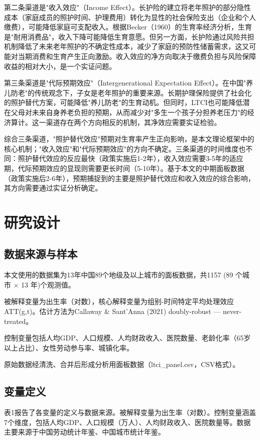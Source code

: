 \documentclass[11pt,a4paper]{article}
\begin{document}
第二条渠道是"收入效应"（Income Effect）。长护险的建立将老年照护的部分隐性成本（家庭成员的照护时间、护理费用）转化为显性的社会保险支出（企业和个人缴费），可能降低家庭可支配收入。根据Becker（1960）的生育率经济分析，生育是"耐用消费品"，收入下降可能降低生育意愿。但另一方面，长护险通过风险共担机制降低了未来老年照护的不确定性成本，减少了家庭的预防性储蓄需求，这又可能对当期消费和生育产生正向激励。收入效应的净方向取决于缴费负担与风险保障收益的相对大小，是一个实证问题。

第三条渠道是"代际预期效应"（Intergenerational Expectation Effect）。在中国"养儿防老"的传统观念下，子女是老年照护的重要来源。长期护理保险提供了社会化的照护替代方案，可能降低"养儿防老"的生育动机。但同时，LTCI也可能降低潜在父母对未来自身养老负担的预期，从而减少对"多生一个孩子分担养老压力"的经济算计。这一渠道存在两个方向相反的机制，其净效应需要实证检验。

综合三条渠道，"照护替代效应"预期对生育率产生正向影响，是本文理论框架中的核心机制；"收入效应"和"代际预期效应"的方向不确定。三条渠道的时间维度也不同：照护替代效应的反应最快（政策实施后1-2年），收入效应需要3-5年的适应期，代际预期效应的显现则需要更长时间（5-10年）。基于本文的中期面板数据（政策实施后2-6年），预期捕捉到的主要是照护替代效应和收入效应的综合影响，其方向需要通过实证分析确定。

\section{研究设计}
\subsection{数据来源与样本}

本文使用的数据集为13年中国89个地级及以上城市的面板数据，共1157 (89 个城市 × 13 年)个观测值。

被解释变量为出生率（对数），核心解释变量为组别-时间特定平均处理效应ATT(g,t)。估计方法为Callaway \& Sant'Anna (2021) doubly-robust — never-treated。

控制变量包括人均GDP、人口规模、人均财政收入、医院数量、老龄化率（65岁以上占比）、女性劳动参与率、城镇化率。

原始数据经清洗、合并后形成分析用面板数据（ltci\_panel.csv，CSV格式）。

\subsection{变量定义}

表1报告了各变量的定义与数据来源。被解释变量为出生率（对数）。控制变量涵盖7个维度，包括人均GDP、人口规模（万人）、人均财政收入、医院数量等。数据主要来源于中国劳动统计年鉴、中国城市统计年鉴。
\end{document}
